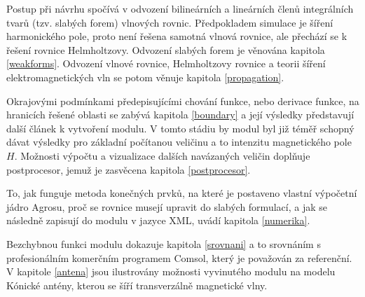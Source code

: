 \documentclass[12pt,a4paper,oneside]{article}
\numberwithin{equation}{section} %
\numberwithin{figure}{section} %
\numberwithin{table}{section} %
\begin{document}
Postup při návrhu spočívá v odvození bilineárních a lineárních členů integrálních tvarů (tzv. slabých forem) vlnových rovnic. Předpokladem simulace je šíření harmonického pole, proto není řešena samotná vlnová rovnice, ale přechází se k řešení rovnice Helmholtzovy. Odvození slabých forem je věnována kapitola \ref{weakforms}. Odvození vlnové rovnice, Helmholtzovy rovnice a teorii šíření elektromagnetických vln se potom věnuje kapitola \ref{propagation}.

Okrajovými podmínkami předepisujícími chování funkce, nebo derivace funkce, na hranicích řešené oblasti se zabývá kapitola \ref{boundary} a její výsledky představují další článek k vytvoření modulu. V tomto stádiu by modul byl již téměř schopný dávat výsledky pro základní počítanou veličinu a to intenzitu magnetického pole $H$. Možnosti výpočtu a vizualizace dalších navázaných veličin doplňuje postprocesor, jemuž je zasvěcena kapitola \ref{postprocesor}.

To, jak funguje metoda konečných prvků, na které je postaveno vlastní výpočetní jádro Agrosu, proč se rovnice musejí upravit do slabých formulací, a jak se následně zapisují do modulu v jazyce XML, uvádí kapitola \ref{numerika}.

Bezchybnou funkci modulu dokazuje kapitola \ref{srovnani} a to srovnáním s profesionálním komerčním programem Comsol, který je považován za referenční. V kapitole \ref{antena} jsou ilustrovány možnosti vyvinutého modulu na modelu Kónické antény, kterou se šíří transverzálně magnetické vlny.



\newpage
\end{document}
